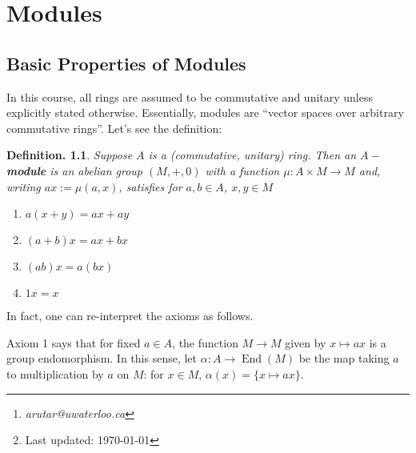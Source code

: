 \documentclass[11pt, a4paper]{memoir}
\title{\subject}
\author{Alex Rutar\thanks{\itshape arutar@uwaterloo.ca}\\ University of Waterloo}
\date{\semester\thanks{Last updated: \today}}
\theoremstyle{change}
\theoremstyle{plain}
\theoremstyle{nonumberplain}
\newtheorem{definition}{Definition.}
\DeclareMathOperator{\End}{End}
\numberwithin{equation}{section}
\begin{document}
\hypersetup{pageanchor=false}
\maketitle
\newpage
\frontmatter
\hypersetup{pageanchor=true}
\tableofcontents*
\newpage
\mainmatter


\chapter{Modules}
\section{Basic Properties of Modules}
In this course, all rings are assumed to be commutative and unitary unless explicitly stated otherwise.
Essentially, modules are ``vector spaces over arbitrary commutative rings''.
Let's see the definition:
\begin{definition}
    Suppose $A$ is a (commutative, unitary) ring.
    Then an \textbf{$A-$module} is an abelian group $(M,+,0)$ with a function $\mu:A\times M\to M$ and, writing $ax:=\mu(a,x)$, satisfies for $a,b\in A$, $x,y\in M$
    \begin{enumerate}[nolistsep]
        \item $a(x+y)=ax+ay$
        \item $(a+b)x=ax+bx$
        \item $(ab)x=a(bx)$
        \item $1x=x$
    \end{enumerate}
\end{definition}
In fact, one can re-interpret the axioms as follows.

Axiom 1 says that for fixed $a\in A$, the function $M\to M$ given by $x\mapsto ax$ is a group endomorphism.
In this sense, let $\alpha:A\to\End(M)$ be the map taking $a$ to multiplication by $a$ on $M$: for $x\in M$, $\alpha(x)=\{x\mapsto ax\}$.
\end{document}

